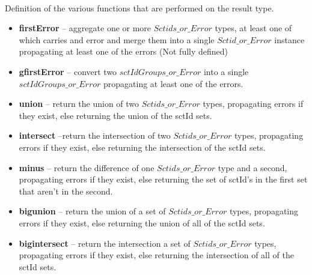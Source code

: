 \documentclass{article}
\begin{document}
\paragraph{}
Definition of the various functions that are performed on the result type. \\
\begin{itemize}[noitemsep,nolistsep]
\item \textbf{firstError} -- aggregate one or more $Sctids\_or\_Error$ types, at least one of which carries and error and merge them into a single $Sctid\_or\_Error$ instance propagating at least one of the errors (Not fully defined)
\item \textbf{gfirstError} -- convert two $sctIdGroups\_or\_Error$ into a single $sctIdGroups\_or\_Error$ propagating at least one of the errors.
\end{itemize}

\begin{itemize}[noitemsep]
\item \textbf{union} -- return the union of two $Sctids\_or\_Error$ types, propagating errors if they exist, else returning the union of the sctId sets.
\item \textbf{intersect} --return the intersection of two $Sctids\_or\_Error$ types, propagating errors if they exist, else returning the intersection of the sctId sets.
\item \textbf{minus} -- return the difference of one $Sctids\_or\_Error$ type and a second, propagating errors if they exist, else returning the set of sctId's in the first set that aren't in the second. 
\item \textbf{bigunion} -- return the union of a set of $Sctids\_or\_Error$ types, propagating errors if they exist, else returning the union of  all of the sctId sets.
\item \textbf{bigintersect} -- return the intersection a set of $Sctids\_or\_Error$ types, propagating errors if they exist, else returning the intersection of all of  the sctId sets.
\end{itemize}
\end{document}
